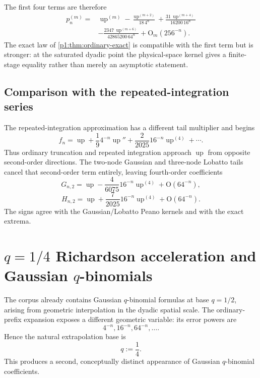 \documentclass[11pt]{article}
\numberwithin{equation}{section}
\theoremstyle{definition}
\theoremstyle{remark}
\newcommand{\Up}{\operatorname{up}}
\newcommand{\Oh}{\mathrm O}
\begin{document}
The first four terms are therefore
\begin{equation}
 \boxed{
 \begin{aligned}
 p_n^{(m)}={}&\Up^{(m)}
 -\frac{\Up^{(m+2)}}{18\,4^n}
 +\frac{31\,\Up^{(m+4)}}{16200\,16^n}\\
 &-\frac{2347\,\Up^{(m+6)}}{42865200\,64^n}
 +\Oh_m(256^{-n}).
 \end{aligned}}
 \label{p1:eq:prefix-first-terms}
\end{equation}
The exact law of \cref{p1:thm:ordinary-exact} is compatible with the first term but is stronger: at the saturated dyadic point the physical-space kernel gives a finite-stage equality rather than merely an asymptotic statement.

\subsection{Comparison with the repeated-integration series}

The repeated-integration approximation has a different tail multiplier and begins
\[
 f_n=\Up+\frac1{9}4^{-n}\Up''+\frac{2}{2025}16^{-n}\Up^{(4)}+\cdots.
\]
Thus ordinary truncation and repeated integration approach $\Up$ from opposite second-order directions.  The two-node Gaussian and three-node Lobatto tails cancel that second-order term entirely, leaving fourth-order coefficients
\begin{equation}
 G_{n,2}=\Up-\frac4{6075}16^{-n}\Up^{(4)}+\Oh(64^{-n}),
 \label{p1:eq:G2-leading}
\end{equation}
\begin{equation}
 H_{n,2}=\Up+\frac7{2025}16^{-n}\Up^{(4)}+\Oh(64^{-n}).
 \label{p1:eq:H2-leading}
\end{equation}
The signs agree with the Gaussian/Lobatto Peano kernels and with the exact extrema.

\section{$q=1/4$ Richardson acceleration and Gaussian $q$-binomials}
\label{p1:sec:q-richardson}

The corpus already contains Gaussian $q$-binomial formulas at base $q=1/2$, arising from geometric interpolation in the dyadic spatial scale.  The ordinary-prefix expansion exposes a different geometric variable: its error powers are
\[
 4^{-n},16^{-n},64^{-n},\ldots.
\]
Hence the natural extrapolation base is
\begin{equation}
 q:=\frac14.
 \label{p1:eq:q-quarter}
\end{equation}
This produces a second, conceptually distinct appearance of Gaussian $q$-binomial coefficients.
\end{document}
